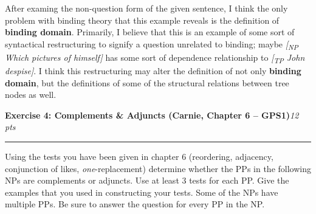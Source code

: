 \documentclass[12pt,letterpaper]{article}
\newcommand{\npb}[1]{\emph{[\textsubscript{NP} #1]}}
\newcommand{\exercise}[2]{
	\par{\large\bfseries #1}\hfill\emph{#2 pts}
	\par\vspace*{-2ex}\rule{\linewidth}{0.1pt}
	\par\vspace*{1.5ex}
}
\begin{document}
After examing the non-question form of the given sentence, I think the only problem with binding
theory that this example reveals is the definition of \textbf{binding domain}. Primarily, I believe
that this is an example of some sort of syntactical restructuring to signify a question unrelated
to binding; maybe \npb{Which pictures of himself} has some sort of dependence relationship to
\emph{[\textsubscript{TP} John despise]}. I think this restructuring may alter the definition of 
not only \textbf{binding domain}, but the definitions of some of the structural relations between
tree nodes as well.

\newpage\exercise{Exercise 4: Complements \& Adjuncts (Carnie, Chapter 6 -- GPS1)}{12}

Using the tests you have been given in chapter 6 (reordering, adjacency, conjunction of likes,
\emph{one}-replacement) determine whether the PPs in the following NPs are complements or adjuncts.
Use at least 3 tests for each PP. Give the examples that you used in constructing your tests. Some
of the NPs have multiple PPs. Be sure to answer the question for every PP in the NP.
\end{document}
